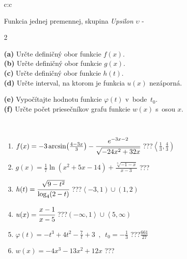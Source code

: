 \documentclass[10pt]{report}
\begin{document}
\begin{tabular}{c:c}
\begin{minipage}[c][104.5mm][t]{0.5\linewidth}
\begin{center}
{\huge Funkcia jednej premennej, skupina \textit{Upsilon $\upsilon$} -}\\[5mm]
\begin{minipage}{0.95\linewidth}
\begin{center}
{\small \begin{multicols}{2} \raggedright
\textbf{(a)} Určte definičný obor funkcie \(f(x)\). \\[1mm]
\textbf{(b)} Určte definičný obor funkcie \(g(x)\). \\[1mm]
\textbf{(c)} Určte definičný obor funkcie \(h(t)\). \\[1mm]
\textbf{(d)} Určte interval, na ktorom je funkcia \(u(x)\) nezáporná. \par \columnbreak
\textbf{(e)} Vypočítajte hodnotu funkcie \(\varphi(t)\) v~bode~\(t_0\). \\[1mm]
\textbf{(f)} Určte počet priesečníkov grafu funkcie \(w(x)\) s~osou \(x\). \\[1mm]
\end{multicols}
}
\end{center}
\end{minipage}
\\[4mm]
\begin{minipage}{0.79\linewidth}
\begin{center}
\begin{varwidth}{\linewidth}
\begin{enumerate}
\small
\item $f(x) = -3\arcsin\!\left( \frac{4-3x}{3} \right) - \cfrac{e^{-3x-2}}{\sqrt{-24x^2+32x}}$\quad \dotfill\; ???\;\dotfill \quad $\left\langle\frac{1}{3} , \frac{4}{3}\right)$
\item $g(x) = \frac{1}{7} \ln{\!(x^2+5x-14)}+\frac{\sqrt[3]{-1-x}}{x-3}$\quad \dotfill\; ???\;\dotfill {}
\item $h(t) = \cfrac{\sqrt{9-t^2}}{\log_4(2-t)}$\quad \dotfill\; ???\;\dotfill \quad $\left\langle-3 , 1\right)\cup\left(1 , 2\right)$
\item $u(x) = \cfrac{x-1}{x-5}$\quad \dotfill\; ???\;\dotfill \quad $\left(-\infty , 1\right\rangle\cup\left\langle5 , \infty\right)$
\item $\varphi(t) = -t^3+4t^2-\frac{7}{t}+3 \enspace , \enspace t_0=-\frac{1}{3}$\quad \dotfill\; ???\;\dotfill \quad $\frac{661}{27}$
\item $w(x) = -4x^3-13x^2+12x$\quad \dotfill\; ???\;\dotfill {}
\end{enumerate}

\end{varwidth}
\end{center}
\end{minipage}
\end{center}
\end{minipage}
\end{tabular}
\end{document}
